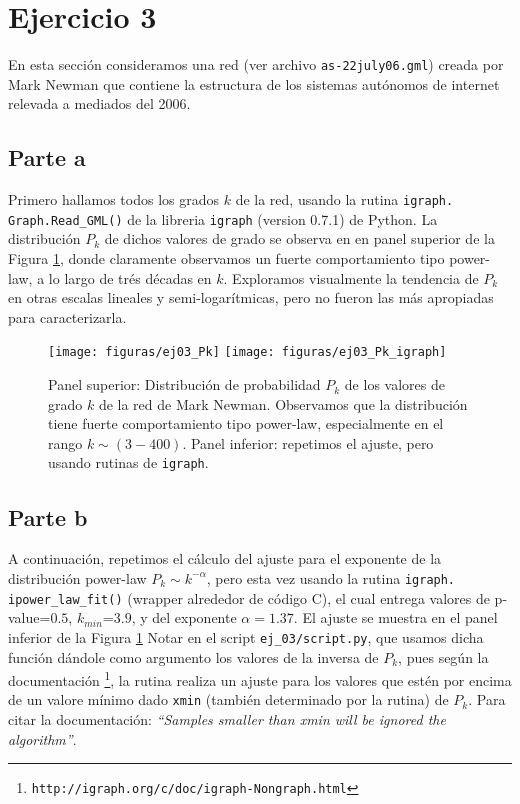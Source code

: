 \section{Ejercicio 3}

En esta secci\'on consideramos una red (ver archivo \texttt{as-22july06.gml}) creada por Mark Newman que contiene la estructura de los sistemas aut\'onomos de internet relevada a mediados del 2006.


\subsection{Parte a}
\def \ScriptA {\texttt{ej\_03/script.py}}

Primero hallamos todos los grados $k$ de la red, usando la rutina \texttt{igraph.\\
Graph.Read\_GML()} de la libreria \texttt{igraph} (version 0.7.1) de Python.
La distribuci\'on $P_k$ de dichos valores de grado se observa en en panel superior de la Figura \ref{fig:ej03_1}, donde claramente observamos un fuerte comportamiento tipo power-law, a lo largo de tr\'es d\'ecadas en $k$.
Exploramos visualmente la tendencia de $P_k$ en otras escalas lineales y semi-logar\'itmicas, pero no fueron las m\'as apropiadas para caracterizarla.


\begin{figure}
\centering
\texttt{[image: figuras/ej03\_Pk]}
\texttt{[image: figuras/ej03\_Pk\_igraph]}
\caption{
    Panel superior: Distribuci\'on de probabilidad $P_k$ de los valores de grado $k$ de la red de Mark Newman.
Observamos que la distribuci\'on tiene fuerte comportamiento tipo power-law, especialmente en el rango $k \sim (3-400)$.
    Panel inferior: repetimos el ajuste, pero usando rutinas de \texttt{igraph}.}
\label{fig:ej03_1}
\end{figure}



\subsection{Parte b}
\def \ScriptB {\texttt{ej\_03/script.py}}

A continuaci\'on, repetimos el c\'alculo del ajuste para el exponente de la distribuci\'on power-law $P_k \sim k^{-\alpha}$, pero esta vez usando la rutina \texttt{igraph.\\
ipower\_law\_fit()} (wrapper alrededor de c\'odigo C), el cual entrega valores de p-value=$0.5$, $k_{min}$=$3.9$, y del exponente $\alpha=1.37$.
El ajuste se muestra en el panel inferior de la Figura \ref{fig:ej03_1}
Notar en el script \ScriptB, que usamos dicha funci\'on d\'andole como argumento los valores de la inversa de $P_k$, pues seg\'un la documentaci\'on 
\footnote{\texttt{http://igraph.org/c/doc/igraph-Nongraph.html}}, 
la rutina realiza un ajuste para los valores que est\'en por encima de un valore m\'inimo dado \texttt{xmin} (tambi\'en determinado por la rutina) de $P_k$. 
Para citar la documentaci\'on: \textit{``Samples smaller than xmin will be ignored the algorithm''}.



